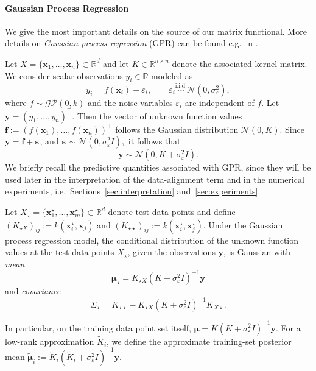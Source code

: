 \documentclass[onefignum,onetabnum]{siamart250211}
\begin{document}
\paragraph{Gaussian Process Regression}
We give the most important details on the source of our matrix functional. More details on \textit{Gaussian process regression} (GPR) can be found e.g.~in \cite{CarlEdwardRasmussenandChristopherK.I.Williams.}.

Let $X = \{\bm{x}_1,\dots,\bm{x}_n\} \subset \mathbb{R}^d$ and let $K \in \mathbb{R}^{n\times n}$ denote the associated kernel matrix. We consider scalar observations $y_i \in \mathbb{R}$ modeled as
\begin{equation*}
    y_i = f(\bm{x}_i) + \varepsilon_i,
    \qquad
    \varepsilon_i \overset{\mathrm{i.i.d.}}{\sim} \mathcal{N}(0,\sigma_\varepsilon^2),
\end{equation*}
where $f \sim \mathcal{GP}(0,k)$ and the noise variables $\varepsilon_i$ are independent of $f$. Let $\bm{y} = (y_1,\dots,y_n)^\top$. Then the vector of unknown function values $\bm{f} := (f(\bm{x}_1),\dots,f(\bm{x}_n))^\top$ follows the Gaussian distribution $\mathcal{N}(0,K)$. Since $\bm{y} = \bm{f} + \boldsymbol{\varepsilon}$, and $\boldsymbol{\varepsilon} \sim \mathcal{N}(0,\sigma_\varepsilon^2 I),$ it follows that
\begin{equation*}
    \bm{y} \sim \mathcal{N}(0, K + \sigma_\varepsilon^2 I).
\end{equation*}
We briefly recall the predictive quantities associated with GPR, since they will be used later in the interpretation of the data-alignment term and in the numerical experiments, i.e.~Sections~\ref{sec:interpretation} and~\ref{sec:experiments}.
\begin{definition}
    Let \(X_\star=\{\bm{x}_1^\star,\hdots,\bm{x}_m^\star\}\subset\mathbb{R}^d\) denote test data points and define
    $(K_{\star X})_{ij}:=k(\bm{x}_i^\star,\bm{x}_j)$ and $(K_{\star\star})_{ij}:=k(\bm{x}_i^\star,\bm{x}_j^\star).$
    Under the Gaussian process regression model, the conditional distribution of the unknown function values at the test data points $X_\star$, given the observations $\bm{y}$, is Gaussian with \emph{mean}
    \begin{equation*}
    \bm\mu_\star = K_{\star X}(K+\sigma_\varepsilon^2 I)^{-1}\bm y
    \end{equation*}
    and \emph{covariance}
    \begin{equation*}
    \Sigma_\star
    =
    K_{\star\star}
    -
    K_{\star X}(K+\sigma_\varepsilon^2 I)^{-1}K_{X\star}.
    \end{equation*}
\end{definition}
In particular, on the training data point set itself, $\bm\mu = K(K+\sigma_\varepsilon^2 I)^{-1}\bm y.$
For a low-rank approximation \(\widetilde K_i\), we define the approximate training-set posterior mean
$\widetilde{\bm\mu}_i:=\widetilde K_i(\widetilde K_i+\sigma_\varepsilon^2 I)^{-1}\bm{y}.$
\end{document}
